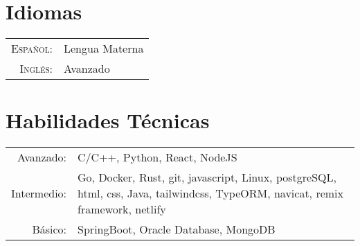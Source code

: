 \documentclass[a4paper,10pt]{article} %
\begin{document}
\section{Idiomas}

\begin{tabular}{rl}
    \textsc{Espa\~nol:} & Lengua Materna\\

    \textsc{Ingl\'es:} & Avanzado\\
\end{tabular}


\section{Habilidades T\'ecnicas}

\begin{tabular}{rl}
    Avanzado: & C/C++, Python, React, NodeJS\\
    Intermedio: & \parbox[t]{0.8\textwidth}{Go, Docker, Rust, git, javascript, Linux, postgreSQL, html, css, Java, tailwindcss, TypeORM, navicat, remix framework, netlify}\\
    B\'asico: & SpringBoot, Oracle Database, MongoDB
\end{tabular}


%

\end{document}
